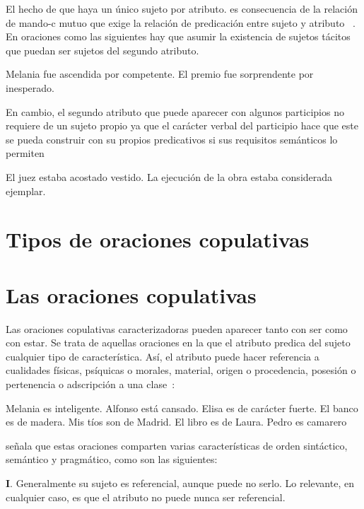 El hecho de que haya un único sujeto por atributo. es consecuencia de la relación de mando-c mutuo que exige la relación de predicación entre sujeto y atributo ~\autocite{Williams1980Predication,Bowers1993The-Syntax-of-Predic}. En oraciones como las siguientes hay que asumir la existencia de sujetos tácitos que puedan ser sujetos del segundo atributo.

\pex[*]
\a Melania fue ascendida por competente.
\a El premio fue sorprendente por inesperado.
\xe


En cambio, el segundo atributo que puede aparecer con algunos participios no requiere de un sujeto propio ya que el carácter verbal del participio hace que este se pueda construir con su propios predicativos si sus requisitos semánticos lo permiten~\autocite{Bosque1999el-sintagma-adjetiva}

\pex[*]
\a	El juez estaba acostado vestido.
\a	La ejecución de la obra estaba considerada ejemplar.
\xe

\section{Tipos de oraciones copulativas}


\section{Las oraciones copulativas}

Las oraciones copulativas caracterizadoras pueden aparecer tanto con ser como con estar. Se trata de aquellas oraciones en la que el atributo predica del sujeto cualquier tipo de característica. Así, el atributo puede hacer referencia a cualidades físicas, psíquicas o morales, material, origen o procedencia, posesión o pertenencia o adscripción a una clase~\parencites[][]{Leborans1999Predicacion}[][]{Bentley20179Copular-and-}:

\pex
\a Melania es inteligente.
\a Alfonso está cansado.
\a Elisa es de carácter fuerte.
\a El banco es de madera.
\a Mis tíos son de Madrid.
\a El libro es de Laura.
\a Pedro es camarero
\xe



{}\textcite{Leborans1999Predicacion} señala que estas oraciones comparten varias características de orden sintáctico, semántico y pragmático, como son las siguientes:


\textbf{I}. Generalmente su sujeto es referencial, aunque puede no serlo. Lo relevante, en cualquier caso, es que el atributo no puede nunca ser referencial.

